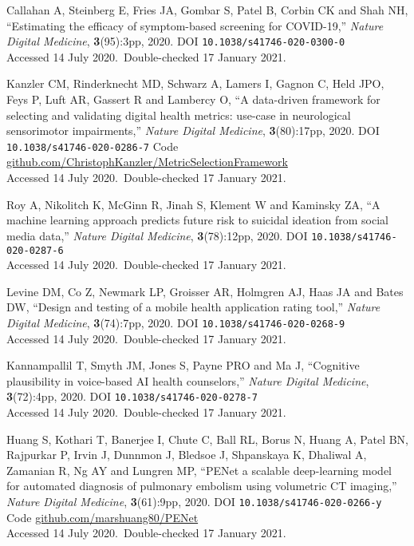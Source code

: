 \vbox{
Callahan A,  Steinberg E,  Fries JA,  Gombar S,  Patel B,  Corbin CK and  Shah NH, ``Estimating the efficacy of symptom-based screening for COVID-19,'' \emph{Nature Digital Medicine}, \textbf{3}(95):3pp, 2020. DOI \texttt{10.1038/s41746-020-0300-0}\\\hfill{Accessed 14 July 2020.}\ {Double-checked 17 January 2021}.}\bibskip

\vbox{
Kanzler CM,  Rinderknecht MD,  Schwarz A,  Lamers I,  Gagnon C,  Held JPO,  Feys P,  Luft AR,  Gassert R and  Lambercy O, ``A data-driven framework for selecting and validating digital health metrics: use-case in neurological sensorimotor impairments,'' \emph{Nature Digital Medicine}, \textbf{3}(80):17pp, 2020. DOI \texttt{10.1038/s41746-020-0286-7} {Code \url{github.com/ChristophKanzler/MetricSelectionFramework}}\\\hfill{Accessed 14 July 2020.}\ {Double-checked 17 January 2021}.}\bibskip

\vbox{
Roy A,  Nikolitch K,  McGinn R,  Jinah S,  Klement W and  Kaminsky ZA, ``A machine learning approach predicts future risk to suicidal ideation from social media data,'' \emph{Nature Digital Medicine}, \textbf{3}(78):12pp, 2020. DOI \texttt{10.1038/s41746-020-0287-6}\\\hfill{Accessed 14 July 2020.}\ {Double-checked 17 January 2021}.}\bibskip

\vbox{
Levine DM,  Co Z,  Newmark LP,  Groisser AR,  Holmgren AJ,  Haas JA and  Bates DW, ``Design and testing of a mobile health application rating tool,'' \emph{Nature Digital Medicine}, \textbf{3}(74):7pp, 2020. DOI \texttt{10.1038/s41746-020-0268-9}\\\hfill{Accessed 14 July 2020.}\ {Double-checked 17 January 2021}.}\bibskip

\vbox{
Kannampallil T,  Smyth JM,  Jones S,  Payne PRO and  Ma J, ``Cognitive plausibility in voice-based AI health counselors,'' \emph{Nature Digital Medicine}, \textbf{3}(72):4pp, 2020. DOI \texttt{10.1038/s41746-020-0278-7}\\\hfill{Accessed 14 July 2020.}\ {Double-checked 17 January 2021}.}\bibskip

\vbox{
Huang S,  Kothari T,  Banerjee I,   Chute C,  Ball RL,  Borus N,  Huang A,  Patel BN,  Rajpurkar P,  Irvin J,  Dunnmon J,   Bledsoe J,  Shpanskaya K,  Dhaliwal A,  Zamanian R,  Ng AY and  Lungren MP, ``PENet a scalable deep-learning model for automated diagnosis of pulmonary embolism using volumetric CT imaging,'' \emph{Nature Digital Medicine}, \textbf{3}(61):9pp, 2020. DOI \texttt{10.1038/s41746-020-0266-y} {Code \url{github.com/marshuang80/PENet}}\\\hfill{Accessed 14 July 2020.}\ {Double-checked 17 January 2021}.}\bibskip

